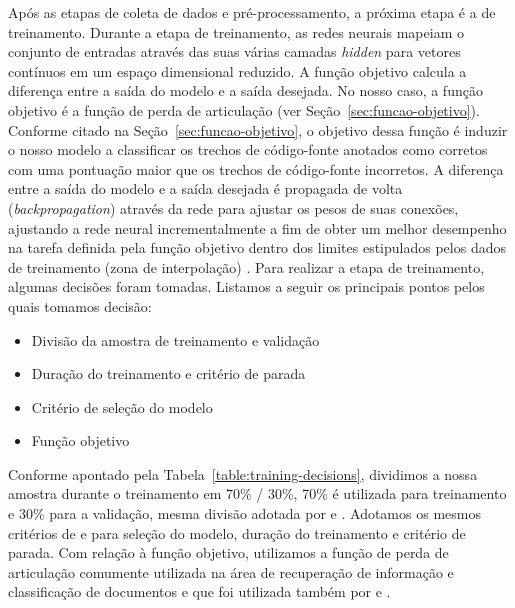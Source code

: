 Após as etapas de coleta de dados e pré-processamento, a próxima etapa é a de treinamento. Durante a etapa de treinamento, as redes neurais mapeiam o conjunto de entradas através das suas várias camadas \textit{hidden} para vetores contínuos em um espaço dimensional reduzido. A função objetivo calcula a diferença entre a saída do modelo e a saída desejada. No nosso caso, a função objetivo é a função de perda de articulação (ver Seção~\ref{sec:funcao-objetivo}). Conforme citado na Seção~\ref{sec:funcao-objetivo}, o objetivo dessa função é induzir o nosso modelo a classificar os trechos de código-fonte anotados como corretos com uma pontuação maior que os trechos de código-fonte incorretos. A diferença entre a saída do modelo e a saída desejada é propagada de volta (\textit{backpropagation}) através da rede para ajustar os pesos de suas conexões, ajustando a rede neural incrementalmente a fim de obter um melhor desempenho na tarefa definida pela função objetivo dentro dos limites estipulados pelos dados de treinamento (zona de interpolação) \cite{hasson-direct-fit-to-nature-evolutionary-perspective-ann:2020}. Para realizar a etapa de treinamento, algumas decisões foram tomadas. Listamos a seguir os principais pontos pelos quais tomamos decisão:

\begin{itemize}
    \item Divisão da amostra de treinamento e validação
    \item Duração do treinamento e critério de parada
    \item Critério de seleção do modelo
    \item Função objetivo
\end{itemize}

Conforme apontado pela Tabela~\ref{table:training-decisions}, dividimos a nossa amostra durante o treinamento em 70\% / 30\%, 70\% é utilizada para treinamento e 30\% para a validação, mesma divisão adotada por  e . Adotamos os mesmos critérios de  e  para seleção do modelo, duração do treinamento e critério de parada. Com relação à função objetivo, utilizamos a função de perda de articulação comumente utilizada na área de recuperação de informação e classificação de documentos e que foi utilizada também por  e .


